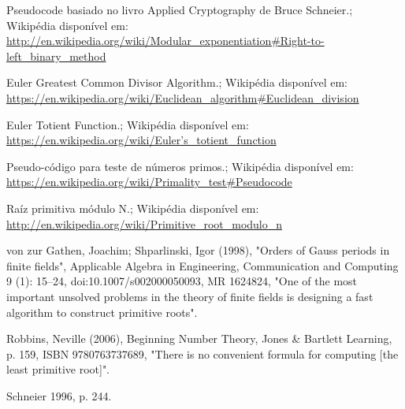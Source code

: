 \documentclass[conference]{IEEEtran}
\begin{document}
\begin{thebibliography}{1}
 Pseudocode basiado no livro Applied Cryptography de Bruce
Schneier.; Wikipédia disponível em:
\href{http://en.wikipedia.org/wiki/Modular_exponentiation#Right-to-left_binary_method}{http://en.wikipedia.org/wiki/Modular\_exponentiation\#Right-to-left\_binary\_method}

 Euler Greatest Common Divisor Algorithm.; Wikipédia disponível em:
\href{https://en.wikipedia.org/wiki/Euclidean_algorithm#Euclidean_division}{https://en.wikipedia.org/wiki/Euclidean\_algorithm\#Euclidean\_division}

 Euler Totient Function.; Wikipédia disponível em:
\href{https://en.wikipedia.org/wiki/Euler\%27s_totient_function#Computing_Euler.27s_function}{https://en.wikipedia.org/wiki/Euler's\_totient\_function}

 Pseudo-código para teste de números primos.; Wikipédia
disponível em:
\href{https://en.wikipedia.org/wiki/Primality_test#Pseudocode}{https://en.wikipedia.org/wiki/Primality\_test\#Pseudocode}

 Raíz primitiva módulo N.; Wikipédia disponível em:
\href{http://en.wikipedia.org/wiki/Primitive_root_modulo_n}{http://en.wikipedia.org/wiki/Primitive\_root\_modulo\_n}

 von zur Gathen, Joachim; Shparlinski, Igor (1998), "Orders of
Gauss periods in finite fields", Applicable Algebra in Engineering,
Communication and Computing 9 (1): 15–24, doi:10.1007/s002000050093, MR 1624824,
"One of the most important unsolved problems in the theory of finite fields is
designing a fast algorithm to construct primitive roots".

 Robbins, Neville (2006), Beginning Number Theory, Jones \&
Bartlett Learning, p. 159, ISBN 9780763737689, "There is no convenient formula
for computing [the least primitive root]".

 Schneier 1996, p. 244.
\end{thebibliography}

\smallskip
\end{document}
